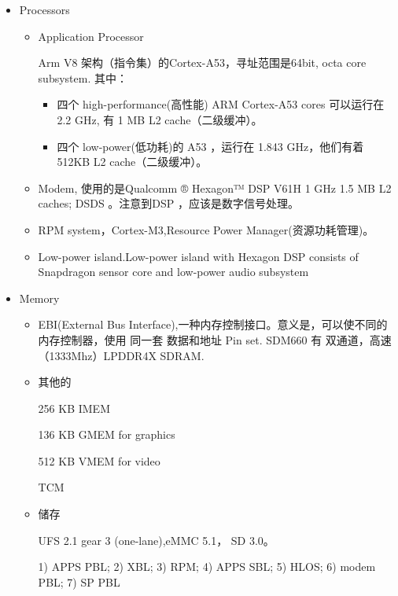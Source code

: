 \begin{itemize}

\item Processors

\begin{itemize}


\item Application Processor

Arm V8 架构（指令集）的Cortex-A53，寻址范围是64bit, octa core subsystem.
其中：
\begin{itemize}
\item 四个 high-performance(高性能) ARM Cortex-A53 cores 可以运行在 2.2 GHz, 有 1 MB L2 cache（二级缓冲）。

\item 四个 low-power(低功耗)的 A53 ，运行在 1.843 GHz，他们有着 512KB L2 cache（二级缓冲）。
\end{itemize}

\item Modem, 使用的是Qualcomm ® Hexagon™ DSP V61H 1 GHz 1.5 MB L2 caches; DSDS 。注意到DSP ，应该是数字信号处理。

\item RPM system，Cortex-M3,Resource Power Manager(资源功耗管理)。

\item Low-power island.Low-power island with Hexagon DSP consists of Snapdragon sensor core and
low-power audio subsystem

\end{itemize}

\item Memory

\begin{itemize}

\item EBI(External Bus Interface),一种内存控制接口。意义是，可以使不同的内存控制器，使用
同一套 数据和地址 Pin set. SDM660 有 双通道，高速（1333Mhz）LPDDR4X SDRAM.

\item 其他的 

256 KB IMEM 

136 KB GMEM for graphics

512 KB VMEM for video

TCM


\item 储存

UFS 2.1 gear 3 (one-lane),eMMC 5.1， SD 3.0。



1) APPS PBL; 2) XBL; 3) RPM; 4) APPS SBL; 5) HLOS; 6) modem PBL;
7) SP PBL


\end{itemize}



\end{itemize}






